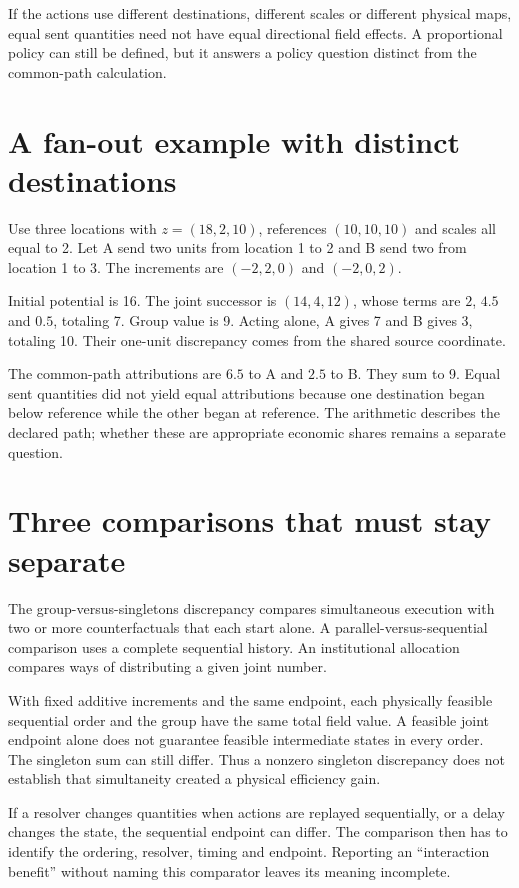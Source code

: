 If the actions use different destinations, different scales or different physical maps, equal sent quantities need not have equal directional field effects. A proportional policy can still be defined, but it answers a policy question distinct from the common-path calculation.

\section{A fan-out example with distinct destinations}
Use three locations with $z=(18,2,10)$, references $(10,10,10)$ and scales all equal to 2. Let A send two units from location 1 to 2 and B send two from location 1 to 3. The increments are $(-2,2,0)$ and $(-2,0,2)$.

Initial potential is 16. The joint successor is $(14,4,12)$, whose terms are $2$, $4.5$ and $0.5$, totaling 7. Group value is 9. Acting alone, A gives 7 and B gives 3, totaling 10. Their one-unit discrepancy comes from the shared source coordinate.

The common-path attributions are $6.5$ to A and $2.5$ to B. They sum to 9. Equal sent quantities did not yield equal attributions because one destination began below reference while the other began at reference. The arithmetic describes the declared path; whether these are appropriate economic shares remains a separate question.

\section{Three comparisons that must stay separate}
The group-versus-singletons discrepancy compares simultaneous execution with two or more counterfactuals that each start alone. A parallel-versus-sequential comparison uses a complete sequential history. An institutional allocation compares ways of distributing a given joint number.

With fixed additive increments and the same endpoint, each physically feasible sequential order and the group have the same total field value. A feasible joint endpoint alone does not guarantee feasible intermediate states in every order. The singleton sum can still differ. Thus a nonzero singleton discrepancy does not establish that simultaneity created a physical efficiency gain.

If a resolver changes quantities when actions are replayed sequentially, or a delay changes the state, the sequential endpoint can differ. The comparison then has to identify the ordering, resolver, timing and endpoint. Reporting an ``interaction benefit'' without naming this comparator leaves its meaning incomplete.


